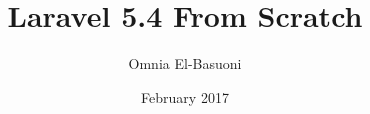 \documentclass[a4paper,12pt]{book}
\begin{document}
\author{Omnia El-Basuoni}
\title{Laravel 5.4 From Scratch}
\date{February 2017}

\frontmatter
\maketitle
\tableofcontents{}

\mainmatter








\backmatter
\end{document}
